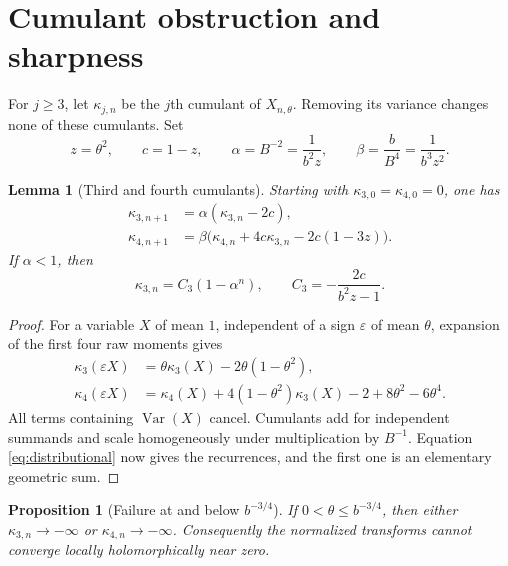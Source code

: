 \documentclass[11pt]{article}
\newtheorem{proposition}[theorem]{Proposition}
\newtheorem{lemma}[theorem]{Lemma}
\theoremstyle{definition}
\newcommand{\Var}{\operatorname{Var}}
\begin{document}
\section{Cumulant obstruction and sharpness}

For $j\geq3$, let $\kappa_{j,n}$ be the $j$th cumulant of
$X_{n,\theta}$. Removing its variance changes none of these cumulants.
Set
\begin{equation}\label{eq:abbrev-cumulants}
 z=\theta^2,\qquad c=1-z,\qquad
 \alpha=B^{-2}=\frac1{b^2z},\qquad
 \beta=\frac b{B^4}=\frac1{b^3z^2}.
\end{equation}

\begin{lemma}[Third and fourth cumulants]\label{lem:cumulants}
Starting with $\kappa_{3,0}=\kappa_{4,0}=0$, one has
\begin{align}
 \kappa_{3,n+1}&=\alpha(\kappa_{3,n}-2c),\label{eq:k3rec}\\
 \kappa_{4,n+1}&=\beta\bigl(\kappa_{4,n}
                     +4c\kappa_{3,n}-2c(1-3z)\bigr).
                     \label{eq:k4rec}
\end{align}
If $\alpha<1$, then
\begin{equation}\label{eq:k3exact}
 \kappa_{3,n}=C_3(1-\alpha^n),\qquad
 C_3=-\frac{2c}{b^2z-1}.
\end{equation}
\end{lemma}

\begin{proof}
For a variable $X$ of mean $1$, independent of a sign
$\varepsilon$ of mean $\theta$, expansion of the first four raw
moments gives
\begin{align*}
 \kappa_3(\varepsilon X)&=\theta\kappa_3(X)-2\theta(1-\theta^2),\\
 \kappa_4(\varepsilon X)&=\kappa_4(X)
           +4(1-\theta^2)\kappa_3(X)-2+8\theta^2-6\theta^4.
\end{align*}
All terms containing $\Var(X)$ cancel. Cumulants add for independent
summands and scale homogeneously under multiplication by $B^{-1}$.
Equation \eqref{eq:distributional} now gives the recurrences, and the
first one is an elementary geometric sum.
\end{proof}

\begin{proposition}[Failure at and below $b^{-3/4}$]\label{prop:failure}
If $0<\theta\leq b^{-3/4}$, then either
$\kappa_{3,n}\to-\infty$ or $\kappa_{4,n}\to-\infty$.
Consequently the normalized transforms cannot converge locally
holomorphically near zero.
\end{proposition}
\end{document}
